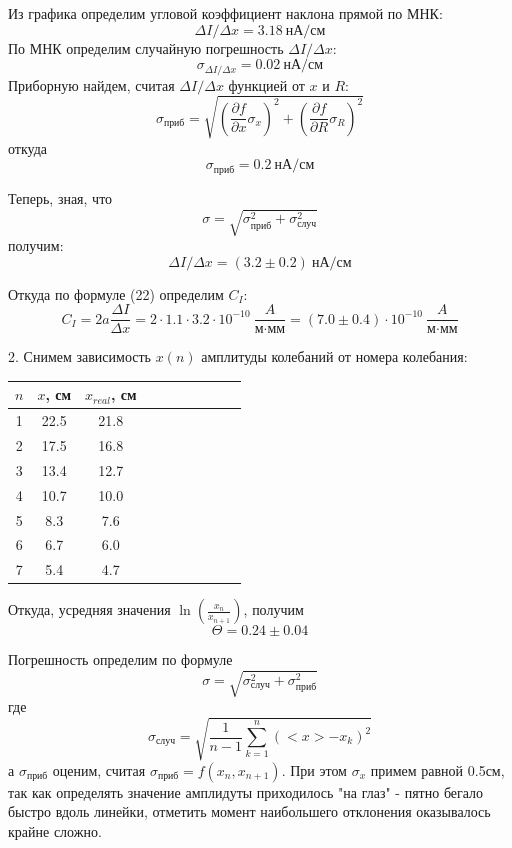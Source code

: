 \documentclass[14pt]{article}
\begin{document}
Из графика определим угловой коэффициент наклона прямой по МНК: 
$$
	\Delta I/\Delta x = 3.18~\text{нА}/\text{см}
$$
По МНК определим случайную погрешность $\Delta I/\Delta x$:
$$
	\sigma_{\Delta I/\Delta x} = 0.02~\text{нА/см}
$$
Приборную найдем, считая $\Delta I/\Delta x$ функцией от $x$ и $R$:
$$
	\sigma_\text{приб} = \sqrt{\left(\frac{\partial f}{\partial x}\sigma_x\right)^2 + \left(\frac{\partial f}{\partial R}\sigma_R\right)^2}
$$
\noindent откуда
$$
	\sigma_\text{приб} = 0.2~\text{нА/см}
$$

\noindent Теперь, зная, что 
$$
	\sigma = \sqrt{\sigma_\text{приб}^2 + \sigma_\text{случ}^2}
$$
\noindent получим:
$$
	\Delta I/\Delta x = (3.2 \pm 0.2)~\text{нА}/\text{см}
$$

\noindent Откуда по формуле (22) определим $C_I$:
$$
	C_I = 2a\frac{\Delta I}{\Delta x} = 2\cdot1.1\cdot3.2\cdot10^{-10}~\frac{A}{\text{м}\cdot\text{мм}} = (7.0 \pm 0.4)\cdot10^{-10}~\frac{A}{\text{м}\cdot\text{мм}}
$$


\vspace{1cm}
2. Снимем зависимость $x(n)$ амплитуды колебаний от номера колебания:

\begin{center}
\begin{tabular}{|c|c|c|c|c|c|c|c|c|c|}
\hline
$n$	&	$x$, см	&	$x_{real}$, см	\\
\hline
1	&	22.5	&	21.8			\\
\hline
2	&	17.5	&	16.8			\\
\hline
3	&	13.4	&	12.7			\\
\hline
4	&	10.7	&	10.0			\\
\hline
5	&	8.3		&	7.6				\\
\hline
6	&	6.7		&	6.0				\\
\hline
7	&	5.4		&	4.7				\\
\hline
\end{tabular}
\end{center}

Откуда, усредняя значения $\ln\left(\frac{x_n}{x_{n+1}}\right)$, получим
$$
	\Theta = 0.24 \pm 0.04
$$

Погрешность определим по формуле
$$
	\sigma = \sqrt{\sigma_{\text{случ}}^2 + \sigma_{\text{приб}}^2}
$$
\noindent где
$$
	\sigma_{\text{случ}} = \sqrt{\frac{1}{n - 1}\sum_{k = 1}^n (<x> - x_k)^2}
$$
\noindent а $\sigma_{\text{приб}}$ оценим, считая $\sigma_{\text{приб}} = f(x_n, x_{n+1})$. При этом $\sigma_x$ примем равной 0.5см, так как определять значение амплидуты приходилось "на глаз" - пятно бегало быстро вдоль линейки, отметить момент наибольшего отклонения оказывалось крайне сложно.
\end{document}
